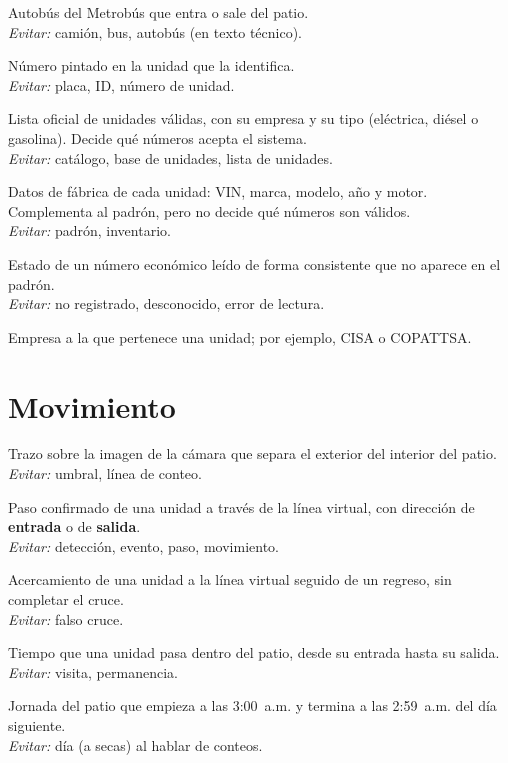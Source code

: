 \begin{description}[style=nextline]
  \item[Unidad] Autobús del Metrobús que entra o sale del patio.\\
        \emph{Evitar:} camión, bus, autobús (en texto técnico).
  \item[Número económico] Número pintado en la unidad que la identifica.\\
        \emph{Evitar:} placa, ID, número de unidad.
  \item[Padrón] Lista oficial de unidades válidas, con su empresa y su
        tipo (eléctrica, diésel o gasolina). Decide qué números acepta el
        sistema.\\
        \emph{Evitar:} catálogo, base de unidades, lista de unidades.
  \item[Catálogo de unidades] Datos de fábrica de cada unidad: VIN, marca,
        modelo, año y motor. Complementa al padrón, pero no decide qué
        números son válidos.\\
        \emph{Evitar:} padrón, inventario.
  \item[Fuera del padrón] Estado de un número económico leído de forma
        consistente que no aparece en el padrón.\\
        \emph{Evitar:} no registrado, desconocido, error de lectura.
  \item[Empresa operadora] Empresa a la que pertenece una unidad; por
        ejemplo, CISA o COPATTSA.
\end{description}

\section{Movimiento}

\begin{description}[style=nextline]
  \item[Línea virtual] Trazo sobre la imagen de la cámara que separa el
        exterior del interior del patio.\\
        \emph{Evitar:} umbral, línea de conteo.
  \item[Cruce] Paso confirmado de una unidad a través de la línea virtual,
        con dirección de \textbf{entrada} o de \textbf{salida}.\\
        \emph{Evitar:} detección, evento, paso, movimiento.
  \item[Maniobra] Acercamiento de una unidad a la línea virtual seguido de
        un regreso, sin completar el cruce.\\
        \emph{Evitar:} falso cruce.
  \item[Estancia] Tiempo que una unidad pasa dentro del patio, desde su
        entrada hasta su salida.\\
        \emph{Evitar:} visita, permanencia.
  \item[Día operativo] Jornada del patio que empieza a las 3:00~a.m. y
        termina a las 2:59~a.m. del día siguiente.\\
        \emph{Evitar:} día (a secas) al hablar de conteos.
\end{description}


